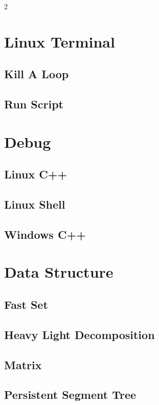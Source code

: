 \documentclass{hxie_template}
\begin{document}
\makecover

\begin{multicols}{2}\section{Linux Terminal}
\subsection{Kill A Loop}

\subsection{Run Script}

\section{Debug}
\subsection{Linux C++}

\subsection{Linux Shell}

\subsection{Windows C++}

\section{Data Structure}
\subsection{Fast Set}

\subsection{Heavy Light Decomposition}

\subsection{Matrix}

\subsection{Persistent Segment Tree}


\end{multicols}
\end{document}

